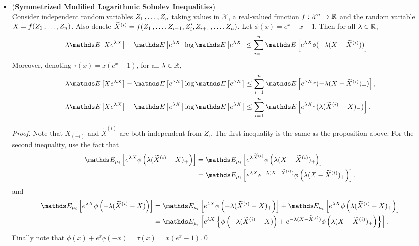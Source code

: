 \documentclass[11pt]{article}
\begin{document}
\begin{itemize}
\item \begin{proposition} (\textbf{Symmetrized Modified Logarithmic Sobolev Inequalities}) \citep{boucheron2013concentration}\\
Consider independent random variables $Z_1 \,{,}\ldots{,}\, Z_n$ taking values in ${\mathcal X}$, a real-valued function $f: {\mathcal X}^n \to {\mathbb R}$ and the random variable $X = f(Z_1 \,{,}\ldots{,}\, Z_n)$. Also denote $\widetilde{X}^{(i)} = f(Z_1 \,{,}\ldots{,}\, Z_{i-1}, Z_i', Z_{i+1} \,{,}\ldots{,}\, Z_n)$. Let $\phi(x) = e^x -x -1$.
Then for all $\lambda \in {\mathbb R}$,
\begin{align}
\lambda \E{}{Xe^{\lambda X}} - \E{}{e^{\lambda X}}\log\E{}{e^{\lambda X}} &\le \sum_{i=1}^{n}\E{}{e^{\lambda X}\phi(-\lambda(X - \widetilde{X}^{(i)}))}\label{ineqn: log_sobolev_inequality_sym_mgf}
\end{align} Moreover, denoting $\tau(x) = x(e^x - 1)$, for all $\lambda \in {\mathbb R}$,
\begin{align*}
\lambda \E{}{Xe^{\lambda X}} - \E{}{e^{\lambda X}}\log\E{}{e^{\lambda X}} &\le \sum_{i=1}^{n}\E{}{e^{\lambda X}\tau(-\lambda(X - \widetilde{X}^{(i)})_{+})},\\
\lambda \E{}{Xe^{\lambda X}} - \E{}{e^{\lambda X}}\log\E{}{e^{\lambda X}} &\le \sum_{i=1}^{n}\E{}{e^{\lambda X}\tau(\lambda(\widetilde{X}^{(i)} - X)_{-})}.
\end{align*}
\end{proposition}
\begin{proof}
Note that $X_{(-i)}$ and $\widetilde{X}^{(i)}$ are both independent from $Z_i$. The first inequality is the same as the proposition above. For the second inequality, use the fact that
\begin{align*}
\E{\mu_i}{e^{\lambda X}\phi\paren{\lambda (\widetilde{X}^{(i)} - X)_{+}}} &= \E{\mu_i}{e^{\lambda \widetilde{X}^{(i)} }\phi\paren{\lambda (X - \widetilde{X}^{(i)})_{+}}}\\
&= \E{\mu_i}{e^{\lambda X}e^{-\lambda ( X- \widetilde{X}^{(i)}) }\phi\paren{\lambda (X - \widetilde{X}^{(i)})_{+}}}.
\end{align*} and
\begin{align*}
\E{\mu_i}{e^{\lambda X}\phi\paren{-\lambda (\widetilde{X}^{(i)} - X)}} &= \E{\mu_i}{e^{\lambda X}\phi\paren{-\lambda (\widetilde{X}^{(i)} - X)_{+}}} + \E{\mu_i}{e^{\lambda X}\phi\paren{\lambda (\widetilde{X}^{(i)} - X)_{+}}}\\
&= \E{\mu_i}{e^{\lambda X}\set{\phi\paren{-\lambda (\widetilde{X}^{(i)} - X)} + e^{-\lambda ( X- \widetilde{X}^{(i)}) }\phi\paren{\lambda (X - \widetilde{X}^{(i)})_{+}}}}.
\end{align*} Finally note that $\phi(x) + e^x \phi(-x) = \tau(x) = x(e^x - 1)$.\qed
\end{proof}

\end{itemize}
\end{document}

